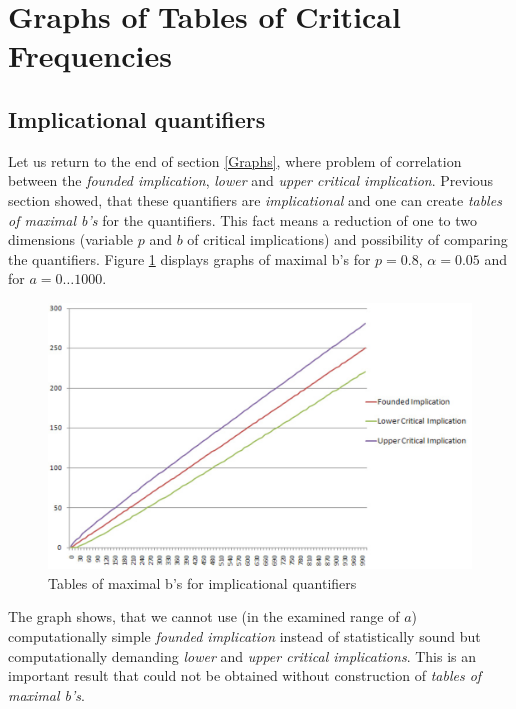 \section{Graphs of Tables of Critical Frequencies} \label{Graphs_Tables}

\subsection{Implicational quantifiers}
Let us return to the end of section \ref{Graphs}, where problem of correlation between the \emph{founded implication}, \emph{lower} and \emph{upper critical implication}. Previous section showed, that these quantifiers are \emph{implicational} and one can create \emph{tables of maximal b's} for the quantifiers. This fact means a reduction of one to two dimensions (variable $p$ and $b$ of critical implications) and possibility of comparing the quantifiers. Figure \ref{fig:Implicational} displays graphs of maximal b's for $p=0.8$, $\alpha=0.05$ and for $a=0\dots1000$.

\begin{figure}[ht]
\centering
\includegraphics[width=115mm]{Implicational.eps}
\caption{Tables of maximal b's for implicational quantifiers}
\label{fig:Implicational}
\end{figure}

The graph shows, that we cannot use (in the examined range of $a$) computationally simple \emph{founded implication} instead of statistically sound but computationally demanding \emph{lower} and \emph{upper critical implications}. This is an important result that could not be obtained without construction of \emph{tables of maximal b's}.

